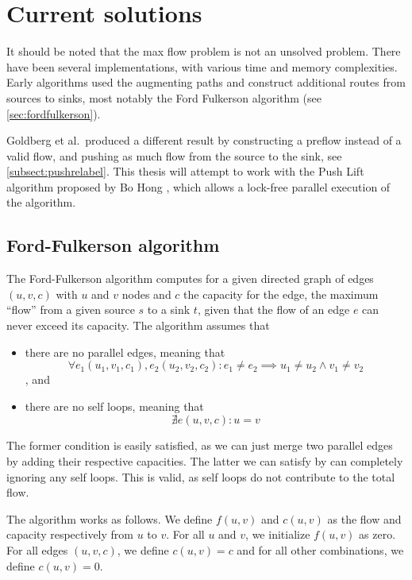 \section{Current solutions}

It should be noted that the max flow problem is not an unsolved problem. There have been several implementations, with various time and memory complexities. Early algorithms used the augmenting paths\cite{LockFreeMultithreadedMaxFlow} and construct additional routes from sources to sinks, most notably the Ford Fulkerson algorithm (see  \autoref{sec:fordfulkerson}).

Goldberg et al.\ produced a different result by constructing a preflow instead of a valid flow\cite{ANewApproachToTheMaxFlowProblem}, and pushing as much flow from the source to the sink, see \autoref{subsect:pushrelabel}. This thesis will attempt to work with the Push Lift algorithm proposed by Bo Hong \cite{LockFreeMultithreadedMaxFlow}, which allows a lock-free parallel execution of the algorithm.

\subsection{Ford-Fulkerson algorithm}
\label{sec:fordfulkerson}

The Ford-Fulkerson algorithm\cite{ford1956maximal} computes for a given directed graph of edges $(u, v, c)$ with $u$ and $v$ nodes and $c$ the capacity for the edge, the maximum ``flow'' from a given source $s$ to a sink $t$, given that the flow of an edge $e$ can never exceed its capacity. The algorithm assumes that

\begin{itemize}
\item there are no parallel edges, meaning that
$$
\forall e_1 (u_1, v_1, c_1), e_2(u_2, v_2, c_2): e_1 \neq e_2 \implies u_1 \neq u_2 \land v_1 \neq v_2
$$, and
\item there are no self loops, meaning that
$$
\nexists e (u, v, c): u = v
$$
\end{itemize}

The former condition is easily satisfied, as we can just merge two parallel edges by adding their respective capacities. The latter we can satisfy by can completely ignoring any self loops. This is valid, as self loops do not contribute to the total flow.

The algorithm works as follows. We define $f(u,v)$ and $c(u, v)$ as the flow and capacity respectively from $u$ to $v$. For all $u$ and $v$, we initialize $f(u, v)$ as zero. For all edges $(u, v, c)$, we define $c(u, v) = c$ and for all other combinations, we define $c(u, v) = 0$.

